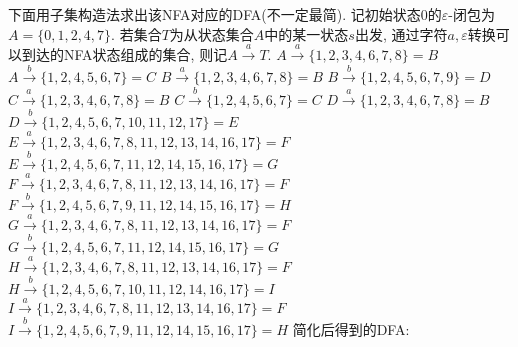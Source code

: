 \documentclass[UTF8]{ctexart}
\begin{document}
	下面用子集构造法求出该NFA对应的DFA(不一定最简).\newline
	记初始状态$0$的$\varepsilon$-闭包为$A = \{0, 1, 2, 4, 7\}$.\newline
	若集合$T$为从状态集合$A$中的某一状态$s$出发, 通过字符$a, \varepsilon$转换可以到达的NFA状态组成的集合, 则记$A\stackrel{a}{\longrightarrow}T$.
	$A\stackrel{a}{\longrightarrow}\{1, 2, 3, 4, 6, 7, 8\} = B$\newline
	$A\stackrel{b}{\longrightarrow}\{1, 2, 4, 5, 6, 7\} = C$\newline
	$B\stackrel{a}{\longrightarrow}\{1, 2, 3, 4, 6, 7, 8\} = B$\newline
	$B\stackrel{b}{\longrightarrow}\{1, 2, 4, 5, 6, 7, 9\} = D$\newline
	$C\stackrel{a}{\longrightarrow}\{1, 2, 3, 4, 6, 7, 8\} = B$\newline
	$C\stackrel{b}{\longrightarrow}\{1, 2, 4, 5, 6, 7\} = C$\newline
	$D\stackrel{a}{\longrightarrow}\{1, 2, 3, 4, 6, 7, 8\} = B$\newline
	$D\stackrel{b}{\longrightarrow}\{1, 2, 4, 5, 6, 7, 10, 11, 12, 17\} = E$\newline
	$E\stackrel{a}{\longrightarrow}\{1, 2, 3, 4, 6, 7, 8, 11, 12, 13, 14, 16, 17\} = F$\newline
	$E\stackrel{b}{\longrightarrow}\{1, 2, 4, 5, 6, 7, 11, 12, 14, 15, 16, 17\} = G$\newline
	$F\stackrel{a}{\longrightarrow}\{1, 2, 3, 4, 6, 7, 8, 11, 12, 13, 14, 16, 17\} = F$\newline
	$F\stackrel{b}{\longrightarrow}\{1, 2, 4, 5, 6, 7, 9, 11, 12, 14, 15, 16, 17\} = H$\newline
	$G\stackrel{a}{\longrightarrow}\{1, 2, 3, 4, 6, 7, 8, 11, 12, 13, 14, 16, 17\} = F$\newline
	$G\stackrel{b}{\longrightarrow}\{1, 2, 4, 5, 6, 7, 11, 12, 14, 15, 16, 17\} = G$\newline
	$H\stackrel{a}{\longrightarrow}\{1, 2, 3, 4, 6, 7, 8, 11, 12, 13, 14, 16, 17\} = F$\newline
	$H\stackrel{b}{\longrightarrow}\{1, 2, 4, 5, 6, 7, 10, 11, 12, 14, 16, 17\} = I$\newline
	$I\stackrel{a}{\longrightarrow}\{1, 2, 3, 4, 6, 7, 8, 11, 12, 13, 14, 16, 17\} = F$\newline
	$I\stackrel{b}{\longrightarrow}\{1, 2, 4, 5, 6, 7, 9, 11, 12, 14, 15, 16, 17\} = H$\newline
	简化后得到的DFA:\newline
\end{document}
